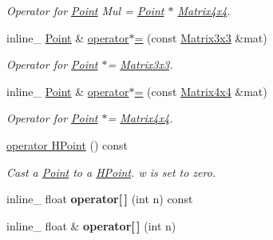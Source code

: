 \begin{DoxyCompactItemize}
\begin{DoxyCompactList}\small\item\em Operator for \hyperlink{classOpcode_1_1Point}{Point} Mul = \hyperlink{classOpcode_1_1Point}{Point} $\ast$ \hyperlink{classOpcode_1_1Matrix4x4}{Matrix4x4}. \end{DoxyCompactList}\item 
inline\+\_\+ \hyperlink{classOpcode_1_1Point}{Point} \& \hyperlink{classOpcode_1_1Point_a24a01fb4aef12df713452658321f2003}{operator$\ast$=} (const \hyperlink{classOpcode_1_1Matrix3x3}{Matrix3x3} \&mat)\hypertarget{classOpcode_1_1Point_a24a01fb4aef12df713452658321f2003}{}\label{classOpcode_1_1Point_a24a01fb4aef12df713452658321f2003}

\begin{DoxyCompactList}\small\item\em Operator for \hyperlink{classOpcode_1_1Point}{Point} $\ast$= \hyperlink{classOpcode_1_1Matrix3x3}{Matrix3x3}. \end{DoxyCompactList}\item 
inline\+\_\+ \hyperlink{classOpcode_1_1Point}{Point} \& \hyperlink{classOpcode_1_1Point_a7d17e56393f0499ee6e1c854d66b3fcd}{operator$\ast$=} (const \hyperlink{classOpcode_1_1Matrix4x4}{Matrix4x4} \&mat)\hypertarget{classOpcode_1_1Point_a7d17e56393f0499ee6e1c854d66b3fcd}{}\label{classOpcode_1_1Point_a7d17e56393f0499ee6e1c854d66b3fcd}

\begin{DoxyCompactList}\small\item\em Operator for \hyperlink{classOpcode_1_1Point}{Point} $\ast$= \hyperlink{classOpcode_1_1Matrix4x4}{Matrix4x4}. \end{DoxyCompactList}\item 
\hyperlink{classOpcode_1_1Point_a9210b0ae57c30d2ac536491469437a1a}{operator H\+Point} () const \hypertarget{classOpcode_1_1Point_a9210b0ae57c30d2ac536491469437a1a}{}\label{classOpcode_1_1Point_a9210b0ae57c30d2ac536491469437a1a}

\begin{DoxyCompactList}\small\item\em Cast a \hyperlink{classOpcode_1_1Point}{Point} to a \hyperlink{classOpcode_1_1HPoint}{H\+Point}. w is set to zero. \end{DoxyCompactList}\item 
inline\+\_\+ float {\bfseries operator\mbox{[}$\,$\mbox{]}} (int n) const \hypertarget{classOpcode_1_1Point_a83a8b55b599caaedaadccaeda98ad60c}{}\label{classOpcode_1_1Point_a83a8b55b599caaedaadccaeda98ad60c}

\item 
inline\+\_\+ float \& {\bfseries operator\mbox{[}$\,$\mbox{]}} (int n)\hypertarget{classOpcode_1_1Point_af530ac843d5545b74563e90f87b9ddef}{}\label{classOpcode_1_1Point_af530ac843d5545b74563e90f87b9ddef}

\end{DoxyCompactItemize}
